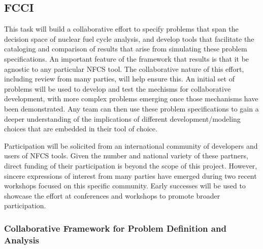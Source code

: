 
\subsection{\gls{FCCI}}

This task will build a collaborative effort to specify problems that span the
decision space of nuclear fuel cycle analysis, and develop tools that
facilitate the cataloging and comparison of results that arise from simulating
these problem specifications.  An important feature of the framework that
results is that it be agnostic to any particular \gls{NFCS} tool.  The
collaborative nature of this effort, including review from many parties, will
help ensure this.  An initial set of problems will be used to develop and test
the mechisms for collaborative development, with more complex problems
emerging once those mechanisms have been demonstrated.  Any team can then use
these problem specifications to gain a deeper understanding of the
implications of different development/modeling choices that are embedded in
their tool of choice.

Participation will be solicited from an international community of developers
and users of \gls{NFCS} tools.  Given the number and national variety of these
partners, direct funding of their participation is beyond the scope of this
project.  However, sincere expressions of interest from many parties have
emerged during two recent workshops focused on this specific community.  Early
successes will be used to showcase the effort at conferences and workshops to
promote broader participation.



\subsubsection{Collaborative Framework for Problem Definition and Analysis} 

